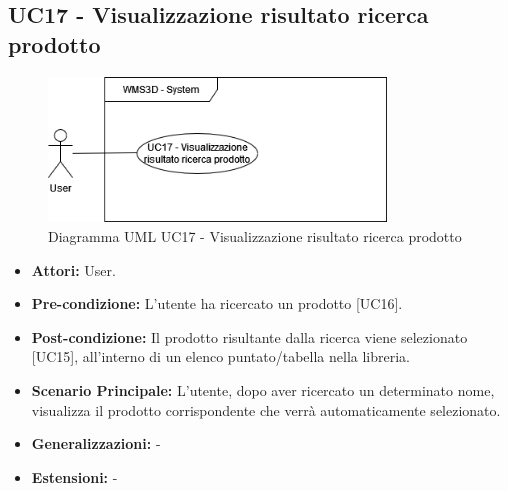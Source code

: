\subsection{UC17 - Visualizzazione risultato ricerca prodotto}
\begin{figure}[H]
  \centering
  \includegraphics[width=0.8\textwidth]{UC_diagrams_11-20/UC17.drawio.png}
   \caption{Diagramma UML UC17 - Visualizzazione risultato ricerca prodotto}
\end{figure}
\begin{itemize}
    \item \textbf{Attori:} User.
    \item \textbf{Pre-condizione:} L'utente ha ricercato un prodotto [UC16].
    \item \textbf{Post-condizione:} Il prodotto risultante dalla ricerca viene selezionato [UC15], all'interno di un elenco puntato/tabella nella libreria.
    \item \textbf{Scenario Principale:} L'utente, dopo aver ricercato un determinato nome, visualizza il prodotto corrispondente che verrà automaticamente selezionato.
    \item \textbf{Generalizzazioni:} -
    \item \textbf{Estensioni:} -
\end{itemize}